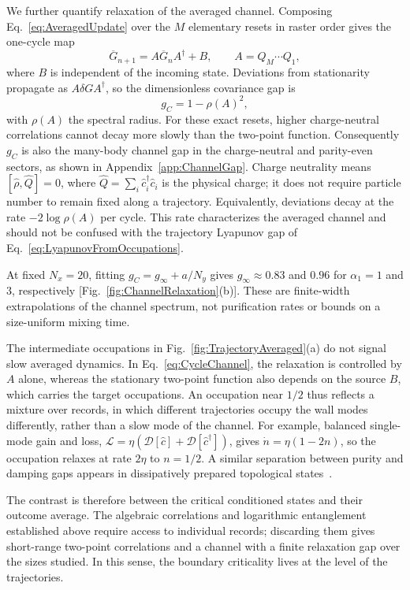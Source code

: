 \documentclass[aps,prb,10pt,twocolumn,superscriptaddress,longbibliography,floatfix]{revtex4-2}
\newcommand{\mc}[1]{\mathcal{#1}}
\newcommand{\newtext}[1]{{\color{blue}#1}}
\newcommand{\claudeadd}[1]{{\color{orange}#1}}
\begin{document}
{\color{blue}
We further quantify relaxation of the averaged channel. Composing Eq.~\eqref{eq:AveragedUpdate} over the $M$ elementary resets in raster order gives the one-cycle map
\begin{equation}
 \overline G_{n+1}=A\overline G_nA^\dagger+B,\qquad A=Q_M\cdots Q_1,
 \label{eq:CycleChannel}
\end{equation}
where $B$ is independent of the incoming state. Deviations from stationarity propagate as $A\delta G A^\dagger$, so the dimensionless covariance gap is
\begin{equation}
 g_C=1-\rho(A)^2,
 \label{eq:ChannelGap}
\end{equation}
with $\rho(A)$ the spectral radius. For these exact resets, higher charge-neutral correlations cannot decay more slowly than the two-point function. Consequently $g_C$ is also the many-body channel gap in the charge-neutral and parity-even sectors, as shown in Appendix~\ref{app:ChannelGap}. Charge neutrality means $[\hat\rho,\hat Q]=0$, where $\hat Q=\sum_i\hat c_i^\dagger\hat c_i$ is the physical charge; it does not require particle number to remain fixed along a trajectory. \claudeadd{Equivalently, deviations decay at the rate $-2\log\rho(A)$ per cycle. This rate characterizes the averaged channel and should not be confused with the trajectory Lyapunov gap of Eq.~\eqref{eq:LyapunovFromOccupations}.}

At fixed $N_x=20$, fitting $g_C=g_\infty+a/N_y$ gives $g_\infty\approx0.83$ and $0.96$ for $\alpha_1=1$ and $3$, respectively [Fig.~\ref{fig:ChannelRelaxation}(b)]. These are finite-width extrapolations of the channel spectrum, not purification rates or bounds on a size-uniform mixing time.

\claudeadd{The intermediate occupations in Fig.~\ref{fig:TrajectoryAveraged}(a) do not signal slow averaged dynamics. In Eq.~\eqref{eq:CycleChannel}, the relaxation is controlled by $A$ alone, whereas the stationary two-point function also depends on the source $B$, which carries the target occupations. An occupation near $1/2$ thus reflects a mixture over records, in which different trajectories occupy the wall modes differently, rather than a slow mode of the channel. \newtext{For example, balanced single-mode gain and loss, $\mc L=\eta(\mc D[\hat c]+\mc D[\hat c^\dagger])$, gives $\dot n=\eta(1-2n)$, so the occupation relaxes at rate $2\eta$ to $n=1/2$.} A similar separation between purity and damping gaps appears in dissipatively prepared topological states~\cite{BardynEtAl2013}.}


The contrast is therefore between the critical conditioned states and their outcome average. The algebraic correlations and logarithmic entanglement established above require access to individual records; discarding them gives short-range two-point correlations and a channel with a finite relaxation gap over the sizes studied. In this sense, the boundary criticality lives at the level of the trajectories.   
}
\end{document}
